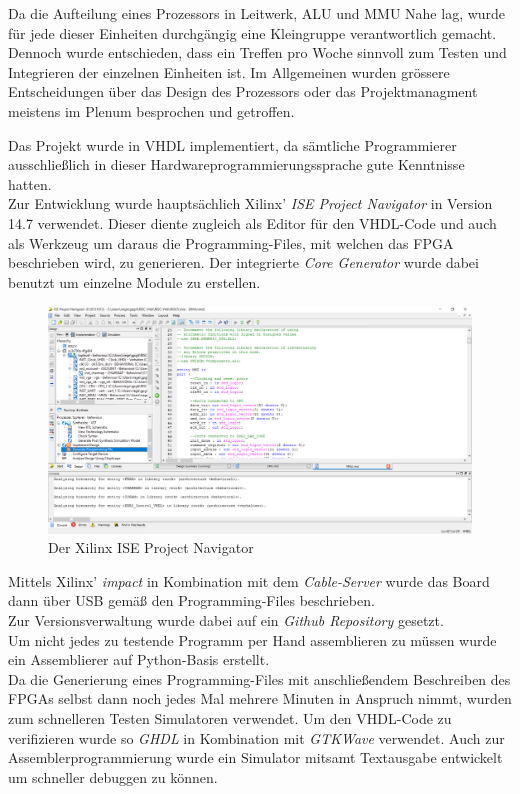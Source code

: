 Da die Aufteilung eines Prozessors in Leitwerk, ALU und MMU Nahe lag, wurde
f\"ur jede dieser Einheiten durchg\"angig eine Kleingruppe verantwortlich
gemacht. Dennoch wurde entschieden, dass ein Treffen pro Woche sinnvoll zum
Testen und Integrieren der einzelnen Einheiten ist. Im Allgemeinen wurden
gr\"ossere Entscheidungen \"uber das Design des Prozessors oder das
Projektmanagment meistens im Plenum besprochen und getroffen.

Das Projekt wurde in VHDL implementiert, da s\"amtliche Programmierer ausschlie{\ss}lich in dieser Hardwareprogrammierungssprache gute Kenntnisse hatten.\\
Zur Entwicklung wurde haupts\"achlich Xilinx' \textit{ISE Project Navigator} in Version 14.7 verwendet. Dieser diente zugleich als Editor f\"ur den VHDL-Code und auch als Werkzeug um daraus die Programming-Files, mit welchen das FPGA beschrieben wird, zu generieren. Der integrierte \textit{Core Generator} wurde dabei benutzt um einzelne Module zu erstellen.\\
\begin{figure}[H]
	\centering
		\includegraphics[width=1.0\textwidth]{ISE.png}
	\caption{Der Xilinx ISE Project Navigator}
	\label{fig:tool}
\end{figure}
Mittels Xilinx' \textit{impact} in Kombination mit dem \textit{Cable-Server} wurde das Board dann \"uber USB gem\"a{\ss} den Programming-Files beschrieben.\\
Zur Versionsverwaltung wurde dabei auf ein \textit{Github Repository} gesetzt.\\ 
Um nicht jedes zu testende Programm per Hand assemblieren zu m\"ussen wurde ein Assemblierer auf Python-Basis erstellt.\\
Da die Generierung eines Programming-Files mit anschlie{\ss}endem Beschreiben des FPGAs selbst dann noch jedes Mal mehrere Minuten in Anspruch nimmt, wurden zum schnelleren Testen Simulatoren verwendet. Um den VHDL-Code zu verifizieren wurde so \textit{GHDL} in Kombination mit \textit{GTKWave} verwendet. Auch zur Assemblerprogrammierung wurde ein Simulator mitsamt Textausgabe entwickelt um schneller debuggen zu k\"onnen.
